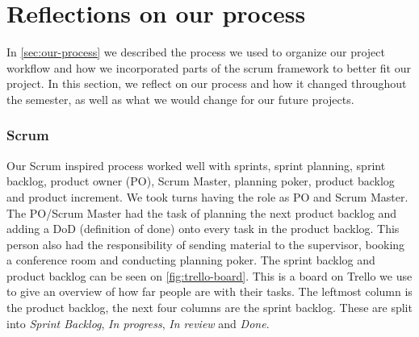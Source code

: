 \section{Reflections on our process}
In \autoref{sec:our-process} we described the process we used to organize our project workflow and how we incorporated parts of the scrum framework to better fit our project.
In this section, we reflect on our process and how it changed throughout the semester, as well as what we would change for our future projects.

\subsubsection{Scrum}
Our Scrum inspired process worked well with sprints, sprint planning, sprint backlog, product owner (PO), Scrum Master, planning poker, product backlog and product increment.
We took turns having the role as PO and Scrum Master.
The PO/Scrum Master had the task of planning the next product backlog and adding a DoD (definition of done) onto every task in the product backlog.
This person also had the responsibility of sending material to the supervisor, booking a conference room and conducting planning poker.
The sprint backlog and product backlog can be seen on \autoref{fig:trello-board}. 
This is a board on Trello we use to give an overview of how far people are with their tasks.
The leftmost column is the product backlog, the next four columns are the sprint backlog.
These are split into \textit{Sprint Backlog}, \textit{In progress}, \textit{In review} and \textit{Done}.

